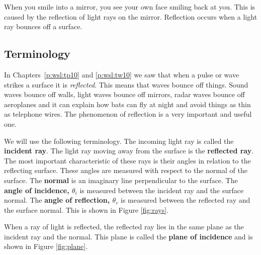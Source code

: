 When you smile into a mirror, you see your own face smiling back at you. This is caused by the reflection of light rays on the mirror. Reflection occurs when a light ray bounces off a surface.

\subsection{Terminology}
In Chapters~\ref{p:wsl:tp10} and \ref{p:wsl:tw10} we saw that when a pulse or wave strikes a surface it is \textit{reflected}. This means that waves bounce off things. Sound waves bounce off walls, light waves bounce off mirrors, radar waves bounce off aeroplanes and it can explain how bats can fly at night and avoid things as thin as telephone wires. The phenomenon of reflection is a very important and useful one.

We will use the following terminology. The incoming light ray is called the \textbf{incident ray}. The light ray moving away from the surface is the \textbf{reflected ray}. The most important characteristic of these rays is their angles in relation to the reflecting surface. These angles are measured with respect to the normal of the surface. The \textbf{normal} is an imaginary line perpendicular to the surface. The \textbf{angle of incidence, $\theta_i$} is measured between the incident ray and the surface normal. The \textbf{angle of reflection, $\theta_r$} is measured between the reflected ray and the surface normal. This is shown in Figure \ref{fig:rays}.

When a ray of light is reflected, the reflected ray lies in the same plane as the incident ray and the normal. This plane is called the \textbf{plane of incidence} and is shown in Figure \ref{fig:plane}.

